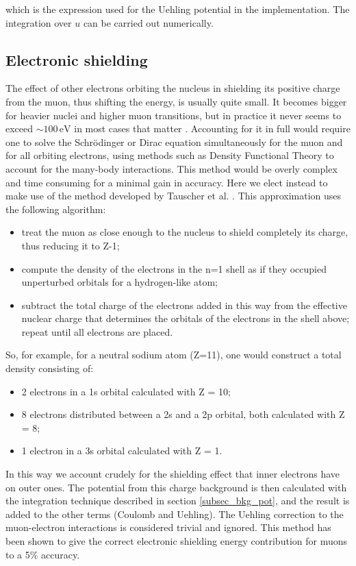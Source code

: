 \documentclass[]{report}
\begin{document}
which is the expression used for the Uehling potential in the implementation. The integration over $u$ can be carried out numerically.

\subsection{Electronic shielding}

The effect of other electrons orbiting the nucleus in shielding its positive charge from the muon, thus shifting the energy, is usually quite small. It becomes bigger for heavier nuclei and higher muon transitions, but in practice it never seems to exceed $\sim100 \,\mathrm{eV}$ in most cases that matter \cite{borie1982}. Accounting for it in full would require one to solve the Schr\"{o}dinger or Dirac equation simultaneously for the muon and for all orbiting electrons, using methods such as Density Functional Theory to account for the many-body interactions. This method would be overly complex and time consuming for a minimal gain in accuracy. Here we elect instead to make use of the method developed by Tauscher et al. \cite{tauscher1978}. This approximation uses the following algorithm:

\begin{itemize}
	\item treat the muon as close enough to the nucleus to shield completely its charge, thus reducing it to Z-1;
	\item compute the density of the electrons in the n=1 shell as if they occupied unperturbed orbitals for a hydrogen-like atom;
	\item subtract the total charge of the electrons added in this way from the effective nuclear charge that determines the orbitals of the electrons in the shell above; repeat until all electrons are placed.
\end{itemize}

So, for example, for a neutral sodium atom (Z=11), one would construct a total density consisting of:

\begin{itemize}
	\item 2 electrons in a 1s orbital calculated with Z = 10;
	\item 8 electrons distributed between a 2s and a 2p orbital, both calculated with Z = 8;
	\item 1 electron in a 3s orbital calculated with Z = 1.
\end{itemize}

In this way we account crudely for the shielding effect that inner electrons have on outer ones. The potential from this charge background is then calculated with the integration technique described in section \ref{subsec_bkg_pot}, and the result is added to the other terms (Coulomb and Uehling). The Uehling correction to the muon-electron interactions is considered trivial and ignored. This method has been shown to give the correct electronic shielding energy contribution for muons to a 5\% accuracy.
\end{document}
